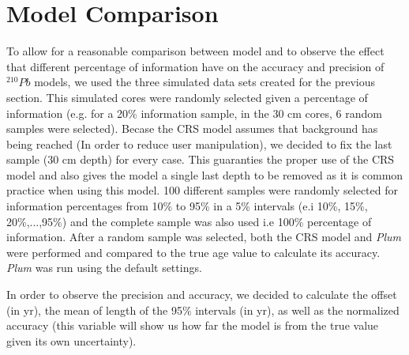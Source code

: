 \documentclass [10pt] {article}
\begin{document}
\section{Model Comparison}

To allow for a reasonable comparison between model and to observe the effect that different percentage of information have on the accuracy and precision of $^{210}Pb$ models, we used the three simulated data sets created for the previous section. 
This simulated cores were randomly selected given a percentage of information (e.g. for a 20\% information sample, in the 30 cm cores, 6 random samples were selected). 
Becase the CRS model assumes that background has being reached (In order to reduce user manipulation), we decided to fix the last sample (30 cm depth) for every case.
This guaranties the proper use of the CRS model and also gives the model a single last depth to be removed as it is common practice when using this model.
100 different samples were randomly selected for information percentages from 10\% to 95\% in a 5\% intervals (e.i 10\%, 15\%, 20\%,...,95\%)  and the complete sample was also used i.e 100\% percentage of information.
After a random sample was selected, both the CRS model and \textit{Plum} were performed and compared to the true age value to calculate its accuracy.
\textit{Plum} was run using the default settings.

In order to observe the precision and accuracy, we decided to calculate the offset (in yr), the mean of length of the 95\% intervals (in yr), as well as the normalized accuracy (this variable will show us how far the model is from the true value given its own uncertainty).  
\end{document}

